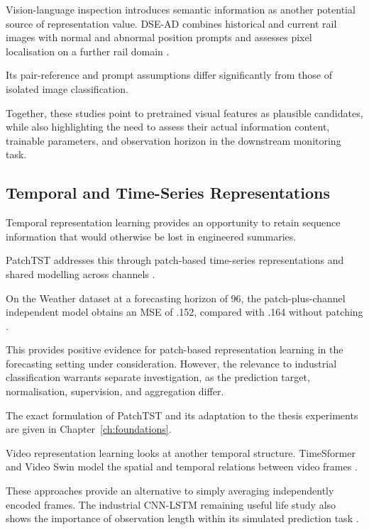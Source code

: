 Vision-language inspection introduces semantic information as another potential source of
representation value. DSE-AD combines historical and current rail images with normal and abnormal
position prompts and assesses pixel localisation on a further rail domain \parencite{P031}.

Its pair-reference and prompt assumptions differ significantly from those of isolated image
classification.

Together, these studies point to pretrained visual features as plausible candidates, while also
highlighting the need to assess their actual information content, trainable parameters, and
observation horizon in the downstream monitoring task.

\subsection{Temporal and Time-Series Representations}

Temporal representation learning provides an opportunity to retain sequence information that would
otherwise be lost in engineered summaries.

PatchTST addresses this through patch-based time-series representations and shared modelling across
channels \parencite[Sections~3.1--3.2]{Nie2023PatchTST}.

On the Weather dataset at a forecasting horizon of 96, the patch-plus-channel independent model
obtains an MSE of .152, compared with .164 without patching \parencite[Table~7]{Nie2023PatchTST}.

This provides positive evidence for patch-based representation learning in the forecasting setting
under consideration. However, the relevance to industrial classification warrants separate
investigation, as the prediction target, normalisation, supervision, and aggregation differ.

The exact formulation of PatchTST and its adaptation to the thesis experiments are given in
Chapter~\ref{ch:foundations}.

Video representation learning looks at another temporal structure. TimeSformer and Video Swin model
the spatial and temporal relations between video frames \parencite{P034,P013}.

These approaches provide an alternative to simply averaging independently encoded frames. The
industrial CNN-LSTM remaining useful life study also shows the importance of observation length
within its simulated prediction task \parencite{AlDulaimi2019A}.


